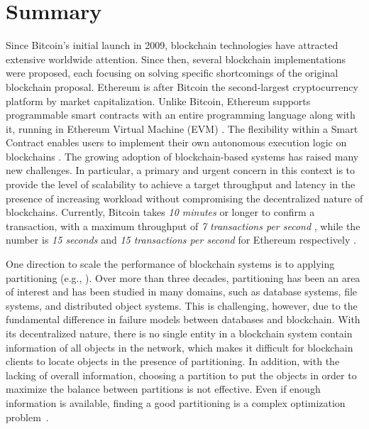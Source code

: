 \newpage
\section{Summary}
Since Bitcoin's initial launch in 2009, blockchain technologies have attracted
extensive worldwide attention. Since then, several blockchain implementations
were proposed, each focusing on solving specific shortcomings of the original
blockchain proposal. Ethereum is after Bitcoin the second-largest cryptocurrency
platform by market capitalization. Unlike Bitcoin, Ethereum supports programmable
smart contracts with an entire programming language along with it, running in
Ethereum Virtual Machine (EVM) \cite{ethereum:evm}. The flexibility within a
Smart Contract enables users to implement their own autonomous execution logic
on blockchains \cite{delmolino2016step, buterin2014next, kosba2016hawk}. The
growing adoption of blockchain-based systems has raised many new challenges. In
particular, a primary and urgent concern in this context is to provide the level
of scalability to achieve a target throughput and latency in the presence of
increasing workload without compromising the decentralized nature of
blockchains. Currently, Bitcoin takes \emph{10 minutes} or longer to confirm a transaction,
with a maximum throughput of \emph{7 transactions per second}
\cite{nakamoto2019bitcoin}, while the number is \emph{15 seconds} and \emph{15
transactions per second} for Ethereum respectively \cite{ethereum:sharding}. 

One direction to scale the performance of blockchain systems is to applying
partitioning (e.g., \cite{facebookTAO, sciascia2012sdur, aguilera2007sinfonia}).
Over more than three decades, partitioning has been an area of interest and has
been studied in many domains, such as database systems, file systems, and
distributed object systems. This is challenging, however, due to the fundamental
difference in failure models between databases and blockchain. With its
decentralized nature, there is no single entity in a blockchain system contain
information of all objects in the network, which makes it difficult for
blockchain clients to locate objects in the presence of partitioning. In
addition, with the lacking of overall information, choosing a partition to put
the objects in order to maximize the balance between partitions is not
effective. Even if enough information is available, finding a good partitioning
is a complex optimization problem~\cite{curino2010sch,taft2014est}.

